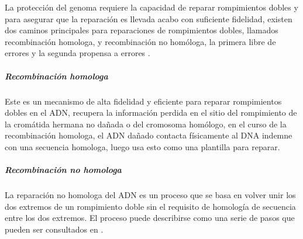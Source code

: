 La protección del genoma requiere la capacidad de reparar rompimientos dobles y para asegurar que la reparación es llevada acabo con suficiente fidelidad, existen dos caminos principales para reparaciones de rompimientos dobles, llamados recombinación homologa, y recombinación no homóloga, la primera libre de errores y la segunda propensa a errores \cite{rescells}.

\subparagraph{Recombinación homologa}
Este es un mecanismo de alta fidelidad y eficiente para reparar rompimientos dobles en el ADN, recupera la información perdida en el sitio del rompimiento de la cromátida hermana no dañada o del cromosoma homólogo, en el curso de la recombinación homologa, el ADN dañado contacta físicamente al DNA indemne con una secuencia homologa, luego usa esto como una plantilla para reparar\cite{rescells}.

\subparagraph{Recombinación no homologa}

La reparación no homologa del ADN  es un proceso que se basa en volver unir los dos extremos de un rompimiento doble sin el requisito de homología de secuencia entre los dos extremos. El proceso puede describirse como una serie de pasos que pueden ser consultados en \cite{rescells}.






